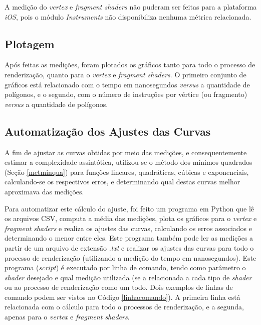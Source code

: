 	A medição do \textit{vertex} e \textit{fragment shaders} não puderam ser feitas para a plataforma \textit{iOS}, pois o módulo \textit{Instruments} não disponibiliza nenhuma métrica relacionada.

\subsection{Plotagem}

	Após feitas as medições, foram plotados os gráficos tanto para todo o processo de renderização, quanto para o \textit{vertex} e \textit{fragment shaders}. O primeiro conjunto de gráficos está relacionado com o tempo em nanosegundos \textit{versus} a quantidade de polígonos, e o segundo, com o número de instruções por vértice (ou fragmento) \textit{versus} a quantidade de polígonos.

\subsection{Automatização dos Ajustes das Curvas}

	A fim de ajustar as curvas obtidas por meio das medições, e consequentemente estimar a complexidade assintótica, utilizou-se o método dos mínimos quadrados (Seção \ref{metminqua}) para funções lineares, quadráticas, cúbicas e exponenciais, calculando-se os respectivos erros, e determinando qual destas curvas melhor aproximava das medições. 

	 Para automatizar este cálculo do ajuste, foi feito um programa em Python que lê os arquivos CSV, computa a média das medições, plota os gráficos para o \textit{vertex} e \textit{fragment} \textit{shaders} e realiza os ajustes das curvas, calculando os erros associados e determinando o menor entre eles.  Este programa também pode ler as medições a partir de um arquivo de extensão .\textit{txt} e realizar os ajustes das curvas para todo o processo de renderização (utilizando a medição do tempo em nanosegundos). Este programa (\textit{script}) é executado por linha de comando, tendo como parâmetro o \textit{shader} desejado e qual medição utilizada (se a relacionada a cada tipo de \textit{shader} ou ao processo de renderização como um todo. Dois exemplos de linhas de comando podem ser vistos no Código \ref{linhacomando}). A primeira linha está relacionada com o cálculo para todo o processos de renderização, e a segunda, apenas para o \textit{vertex} e \textit{fragment shaders}.

	

